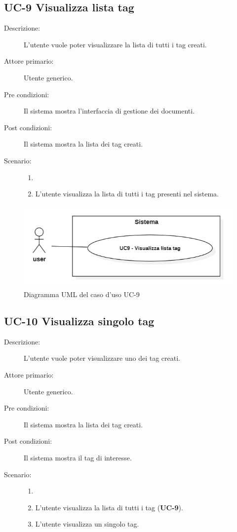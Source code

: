 \subsection{UC-9 Visualizza lista tag}
\begin{description}
    \item[Descrizione:] L’utente vuole poter visualizzare la lista di tutti i tag creati.
    \item[Attore primario:] Utente generico.
    \item[Pre condizioni:] Il sistema mostra l'interfaccia di gestione dei documenti.
    \item[Post condizioni:] Il sistema mostra la lista dei tag creati.
    \item[Scenario:]
    \begin{enumerate}
        \item[]
        \item L’utente visualizza la lista di tutti i tag presenti nel sistema.
    \end{enumerate}
\end{description}
\begin{figure}[H]
    \centering
    \includegraphics[width=0.8\linewidth]{UC9.PNG} %
    \caption{Diagramma UML del caso d'uso UC-9}
    \label{fig:UC8}
\end{figure}

\subsection{UC-10 Visualizza singolo tag}
\begin{description}
    \item[Descrizione:] L’utente vuole poter visualizzare uno dei tag creati.
    \item[Attore primario:] Utente generico.
    \item[Pre condizioni:] Il sistema mostra la lista dei tag creati.
    \item[Post condizioni:] Il sistema mostra il tag di interesse.
    \item[Scenario:]
    \begin{enumerate}
        \item[]
        \item L’utente visualizza la lista di tutti i tag (\textbf{UC-9}).
        \item L'utente visualizza un singolo tag.
    \end{enumerate}
\end{description}

